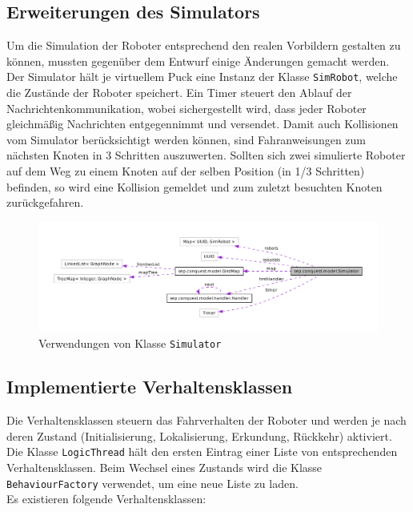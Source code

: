 \documentclass[10pt,a4paper]{article}
\begin{document}
  		\subsection{Erweiterungen des Simulators}
			Um die Simulation der Roboter entsprechend den realen Vorbildern gestalten zu können, mussten gegenüber dem Entwurf einige Änderungen gemacht werden.
			Der Simulator hält je virtuellem Puck eine Instanz der Klasse \texttt{SimRobot}, welche die Zustände der Roboter speichert. Ein Timer steuert den
			Ablauf der Nachrichtenkommunikation, wobei sichergestellt wird, dass jeder Roboter gleichmäßig Nachrichten entgegennimmt und versendet. Damit auch
			Kollisionen vom Simulator berücksichtigt werden können, sind Fahranweisungen zum nächsten Knoten in 3 Schritten auszuwerten. Sollten sich zwei
			simulierte Roboter auf dem Weg zu einem Knoten auf der selben Position (in 1/3 Schritten) befinden, so wird eine Kollision gemeldet und zum zuletzt
			besuchten Knoten zurückgefahren.
  		
			\begin{figure}[htbp]
				\centering
				\includegraphics[width=12cm]{images/call_Simulator.pdf} 
  				\caption{Verwendungen von Klasse \texttt{Simulator}}
  				\label{fig:call_Simulator}
  			\end{figure}  		
  			
  		\subsection{Implementierte Verhaltensklassen}
  			Die Verhaltensklassen steuern das Fahrverhalten der Roboter und werden je nach deren Zustand (Initialisierung, Lokalisierung, Erkundung, Rückkehr)
  			aktiviert. Die Klasse \texttt{LogicThread} hält den ersten Eintrag einer Liste von entsprechenden Verhaltensklassen. Beim Wechsel eines Zustands
  			wird die Klasse \texttt{BehaviourFactory} verwendet, um eine neue Liste zu laden. \\
  			Es existieren folgende Verhaltensklassen:
  			
\end{document}
